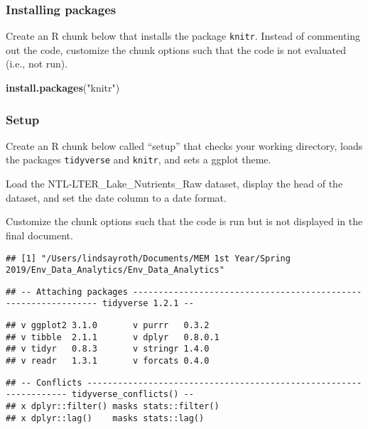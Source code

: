 \documentclass[]{article}
\newenvironment{Shaded}{\begin{snugshade}}{\end{snugshade}}
\newcommand{\KeywordTok}[1]{\textcolor[rgb]{0.13,0.29,0.53}{\textbf{#1}}}
\newcommand{\StringTok}[1]{\textcolor[rgb]{0.31,0.60,0.02}{#1}}
\newcommand{\NormalTok}[1]{#1}
\begin{document}
\subsubsection{Installing packages}\label{installing-packages}

Create an R chunk below that installs the package \texttt{knitr}.
Instead of commenting out the code, customize the chunk options such
that the code is not evaluated (i.e., not run).

\begin{Shaded}
\begin{Highlighting}[]
\KeywordTok{install.packages}\NormalTok{(}\StringTok{"knitr"}\NormalTok{)}
\end{Highlighting}
\end{Shaded}

\subsubsection{Setup}\label{setup}

Create an R chunk below called ``setup'' that checks your working
directory, loads the packages \texttt{tidyverse} and \texttt{knitr}, and
sets a ggplot theme.

Load the NTL-LTER\_Lake\_Nutrients\_Raw dataset, display the head of the
dataset, and set the date column to a date format.

Customize the chunk options such that the code is run but is not
displayed in the final document.

\begin{verbatim}
## [1] "/Users/lindsayroth/Documents/MEM 1st Year/Spring 2019/Env_Data_Analytics/Env_Data_Analytics"
\end{verbatim}

\begin{verbatim}
## -- Attaching packages --------------------------------------------------------------- tidyverse 1.2.1 --
\end{verbatim}

\begin{verbatim}
## v ggplot2 3.1.0       v purrr   0.3.2  
## v tibble  2.1.1       v dplyr   0.8.0.1
## v tidyr   0.8.3       v stringr 1.4.0  
## v readr   1.3.1       v forcats 0.4.0
\end{verbatim}

\begin{verbatim}
## -- Conflicts ------------------------------------------------------------------ tidyverse_conflicts() --
## x dplyr::filter() masks stats::filter()
## x dplyr::lag()    masks stats::lag()
\end{verbatim}
\end{document}
